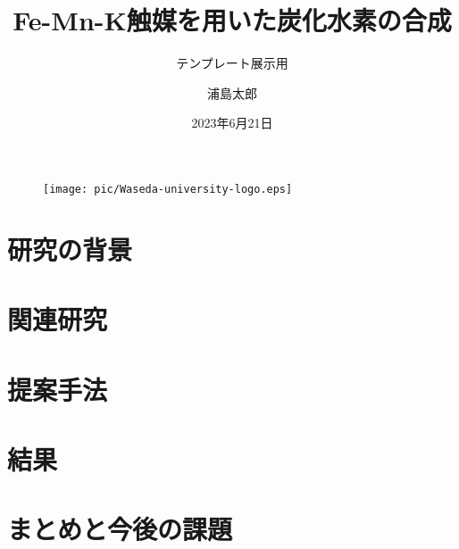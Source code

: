 \documentclass{beamer}
\author{浦島太郎}
\title{Fe-Mn-K触媒を用いた炭化水素の合成}
\subtitle{テンプレート展示用}
\institute{早稻田大学医学部}
\date{2023年6月21日}
\begin{document}
\kaishu
\begin{frame}
    \titlepage
    \begin{figure}[htpb]
        \begin{center}
            \texttt{[image: pic/Waseda-university-logo.eps]}
        \end{center}
    \end{figure}
\end{frame}

\begin{frame}
    \tableofcontents[sectionstyle=show,subsectionstyle=show/shaded/hide,subsubsectionstyle=show/shaded/hide]
\end{frame}


\section{研究の背景}

\begin{frame}
\end{frame}

\section{関連研究}

\begin{frame}
\end{frame}

\section{提案手法}

\begin{frame}
\end{frame}

\section{結果}

\begin{frame}
\end{frame}

\section{まとめと今後の課題}

\begin{frame}
\end{frame}
\end{document}
